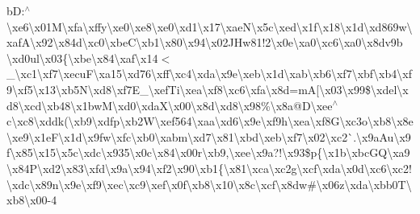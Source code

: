 \begin{DoxyCompactItemize}
b\+D\+:$^\wedge$\textbackslash{}xe6\textbackslash{}x01\+M\textbackslash{}xfa\textbackslash{}xffy\textbackslash{}xe0\textbackslash{}xe8\textbackslash{}xe0\textbackslash{}xd1\textbackslash{}x17\textbackslash{}xae\+N\textbackslash{}x5c\textbackslash{}xed\textbackslash{}x1f\textbackslash{}x18\textbackslash{}x1d\textbackslash{}xd869w\textbackslash{}xaf\+A\textbackslash{}x92\textbackslash{}x84d\textbackslash{}xc0\textbackslash{}xbe\+C\textbackslash{}xb1\textbackslash{}x80\textbackslash{}x94\textbackslash{}x02\+J\+Hw81!2\textbackslash{}x0e\textbackslash{}xa0\textbackslash{}xc6\textbackslash{}xa0\textbackslash{}x8dv9b \textbackslash{}xd0ul\textbackslash{}x03\{\textbackslash{}xbe\textbackslash{}x84\textbackslash{}xaf\textbackslash{}x14$<$\+\_\+\textbackslash{}xc1\textbackslash{}xf7\textbackslash{}xecu\+F\textbackslash{}xa15\textbackslash{}xd76\textbackslash{}xff\textbackslash{}xc4\textbackslash{}xda\textbackslash{}x9e\textbackslash{}xeb\textbackslash{}x1d\textbackslash{}xab\textbackslash{}xb6\textbackslash{}xf7\textbackslash{}xbf\textbackslash{}xb4\textbackslash{}xf9\textbackslash{}xf5\textbackslash{}x13\textbackslash{}xb5\+N\textbackslash{}xd8\textbackslash{}xf7\+E\+\_\+\textbackslash{}xef\+Ti\textbackslash{}xea\textbackslash{}xf8\textbackslash{}xc6\textbackslash{}xfa\textbackslash{}x8d=m\+A\mbox{[}\textbackslash{}x03\textbackslash{}x99\$\textbackslash{}xdel\textbackslash{}xd8\textbackslash{}xcd\textbackslash{}xb48\textbackslash{}x1bw\+M\textbackslash{}xd0\textbackslash{}xda\+X\textbackslash{}x00\textbackslash{}x8d\textbackslash{}xd8\textbackslash{}x98\%\textbackslash{}x8a@\+D\textbackslash{}xee$^\wedge$c\textbackslash{}xc8\textbackslash{}xddk(\textbackslash{}xb9\textbackslash{}xdfp\textbackslash{}xb2\+W\textbackslash{}xef564\textbackslash{}xaa\textbackslash{}xd6\textbackslash{}x9e\textbackslash{}xf9h\textbackslash{}xea\textbackslash{}xf8\+G\textbackslash{}xc3o\textbackslash{}xb8\textbackslash{}x8e\textbackslash{}xe9\textbackslash{}x1e\+F\textbackslash{}x1d\textbackslash{}x9fw\textbackslash{}xfc\textbackslash{}xb0\textbackslash{}xabm\textbackslash{}xd7\textbackslash{}x81\textbackslash{}xbd\textbackslash{}xeb\textbackslash{}xf7\textbackslash{}x02\textbackslash{}xc2\`{}.\textbackslash{}x9a\+Au\textbackslash{}x9f\textbackslash{}x85\textbackslash{}x15\textbackslash{}x5c\textbackslash{}xdc\textbackslash{}x935\textbackslash{}x0c\textbackslash{}x84\textbackslash{}x00r\textbackslash{}xb9,\textbackslash{}xee\textbackslash{}x9a?!\textbackslash{}x93\$p\{\textbackslash{}x1b\textbackslash{}xbc\+G\+Q\textbackslash{}xa9\textbackslash{}x84\+P\textbackslash{}xd2\textbackslash{}x83\textquotesingle{}\textbackslash{}xfd\textbackslash{}x9a\textbackslash{}x94\textbackslash{}xf2\textbackslash{}x90\textbackslash{}xb1\{\textbackslash{}x81\textbackslash{}xca\textbackslash{}xc2g\textbackslash{}xcf\textbackslash{}xda\textbackslash{}x0d\textbackslash{}xc6\textbackslash{}xc2!\textbackslash{}xdc\textbackslash{}x89n\textbackslash{}x9e\textbackslash{}xf9\textbackslash{}xec\textbackslash{}xc9\textbackslash{}xef\textbackslash{}x0f\textbackslash{}xb8\textbackslash{}x10\textbackslash{}x8c\textbackslash{}xcf\textbackslash{}x8dw\#\textbackslash{}x06z\textbackslash{}xda\textbackslash{}xbb0\+T\textbackslash{}xb8\textbackslash{}x00-\/4 
\end{DoxyCompactItemize}
